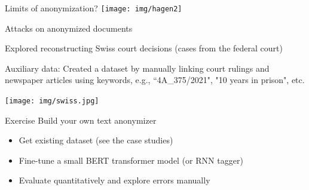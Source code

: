 \documentclass[12pt,aspectratio=169,handout]{beamer}
\begin{document}
\begin{frame}{Limits of anonymization?}
\texttt{[image: img/hagen2]}
\end{frame}


\begin{frame}{Attacks on anonymized documents}

Explored reconstructing Swiss court decisions (cases from the federal court)


Auxiliary data: Created a dataset by manually linking court rulings and newspaper articles using keywords, e.g., ``4A\_375/2021", "10 years in prison", etc.

\texttt{[image: img/swiss.jpg]}




\end{frame}



\begin{frame}{Exercise}
Build your own text anonymizer
\begin{itemize}
\item Get existing dataset (see the case studies)
\item Fine-tune a small BERT transformer model (or RNN tagger)
\item Evaluate quantitatively and explore errors manually
\end{itemize}
\end{frame}
\end{document}
